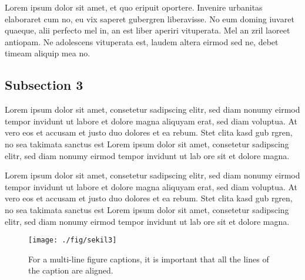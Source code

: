 Lorem ipsum dolor sit amet, et quo eripuit oportere. Invenire urbanitas elaboraret cum no, eu vix saperet gubergren liberavisse. No eum doming iuvaret quaeque, alii perfecto mel in, an est liber aperiri vituperata. Mel an zril laoreet antiopam. Ne adolescens vituperata est, laudem altera eirmod sed ne, debet timeam aliquip mea no.


\subsection{Subsection 3}

Lorem ipsum dolor sit amet, consetetur sadipscing elitr, sed diam nonumy eirmod tempor invidunt ut labore et dolore magna aliquyam erat, sed diam voluptua. At vero eos et accusam et justo duo dolores et ea rebum. Stet clita kasd gub rgren, no sea takimata sanctus est Lorem ipsum dolor sit amet, consetetur sadipscing elitr, sed diam nonumy eirmod tempor invidunt ut lab ore sit et dolore magna.

Lorem ipsum dolor sit amet, consetetur sadipscing elitr, sed diam nonumy eirmod tempor invidunt ut labore et dolore magna aliquyam erat, sed diam voluptua. At vero eos et accusam et justo duo dolores et ea rebum. Stet clita kasd gub rgren, no sea takimata sanctus est Lorem ipsum dolor sit amet, consetetur sadipscing elitr, sed diam nonumy eirmod tempor invidunt ut lab ore sit et dolore magna.

\begin{figure}
	\centering
	\texttt{[image: ./fig/sekil3]}
	\caption{For a multi-line figure captions, it is important that all the lines of the caption are aligned.}
	\label{Figure3.2}
\end{figure}

